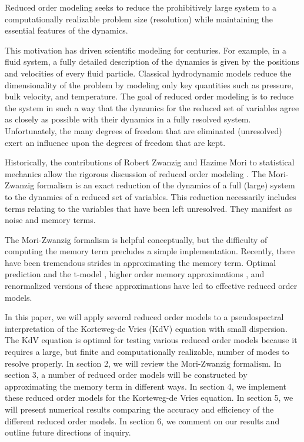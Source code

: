 \documentclass{article}
\begin{document}
Reduced order modeling seeks to reduce the prohibitively large system to a computationally realizable problem size (resolution) while maintaining the essential features of the dynamics.

This motivation has driven scientific modeling for centuries. For example, in a fluid system, a fully detailed description of the dynamics is given by the positions and velocities of every fluid particle. Classical hydrodynamic models reduce the dimensionality of the problem by modeling only key quantities such as pressure, bulk velocity, and temperature. The goal of reduced order modeling is to reduce the system in such a way that the dynamics for the reduced set of variables agree as closely as possible with their dynamics in a fully resolved system. Unfortunately, the many degrees of freedom that are eliminated (unresolved) exert an influence upon the degrees of freedom that are kept.

Historically, the contributions of Robert Zwanzig and Hazime Mori to statistical mechanics allow the rigorous discussion of reduced order modeling \cite{zwanzig1961memory}. The Mori-Zwanzig formalism is an exact reduction of the dynamics of a full (large) system to the dynamics of a reduced set of variables. This reduction necessarily includes terms relating to the variables that have been left unresolved. They manifest as noise and memory terms.

The Mori-Zwanzig formalism is helpful conceptually, but the difficulty of computing the memory term precludes a simple implementation. Recently, there have been tremendous strides in approximating the memory term. Optimal prediction and the t-model \cite{chorin2000optimal,chorin2002optimal,chorin2007problem,hald2007optimal,bernstein2007optimal,beck2009model,stinis2012numerical}, higher order memory approximations \cite{stinis2007higher,stinis2009phase}, and renormalized versions of these approximations \cite{stinis2013renormalized,stinis2015renormalized} have led to effective reduced order models.

In this paper, we will apply several reduced order models to a pseudospectral interpretation of the Korteweg-de Vries (KdV) equation with small dispersion. The KdV equation is optimal for testing various reduced order models because it requires a large, but finite and computationally realizable, number of modes to resolve properly. In section 2, we will review the Mori-Zwanzig formalism. In section 3, a number of reduced order models will be constructed by approximating the memory term in different ways. In section 4, we implement these reduced order models for the Korteweg-de Vries equation. In section 5, we will present numerical results comparing the accuracy and efficiency of the different reduced order models. In section 6, we comment on our results and outline future directions of inquiry.
\end{document}
